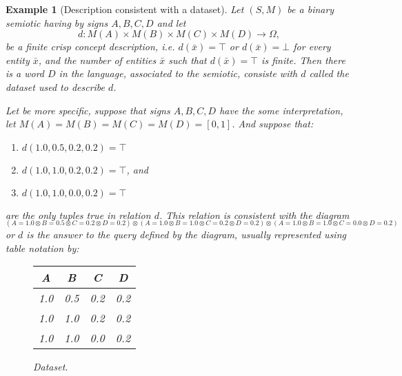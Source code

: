 \documentclass[oribibl]{llncs}
\newtheorem{exam}{Example}
\begin{document}
\begin{exam}[Description consistent with a dataset]
Let $(S,M)$ be a binary semiotic having by signs $A,B,C,D$ and let \[d:M(A)\times M(B)\times M(C)\times M(D)\rightarrow \Omega,\] be a finite crisp concept description, i.e. $d(\bar{x})=\top$ or $d(\bar{x})=\bot$ for every entity $\bar{x}$, and the number of entities $\bar{x}$ such that $d(\bar{x})=\top$ is finite. Then there is a word $D$ in the language, associated to the semiotic, consiste with $d$ called the dataset used to describe $d$.

Let be more specific, suppose that signs $A,B,C,D$ have the some interpretation, let $M(A)=M(B)=M(C)=M(D)=[0,1]$. And suppose that:
\begin{enumerate}
  \item $d(1.0,0.5,0.2,0.2)=\top$
  \item $d(1.0,1.0,0.2,0.2)=\top$, and
  \item $d(1.0,1.0,0.0,0.2)=\top$
\end{enumerate}
 are the only tuples true in relation $d$. This relation is consistent with the diagram
\[_{(A=1.0 \otimes B=0.5 \otimes C=0.2 \otimes D=0.2)\otimes (A=1.0 \otimes B=1.0 \otimes C=0.2 \otimes D=0.2)\otimes (A=1.0 \otimes B=1.0 \otimes C=0.0 \otimes D=0.2)}\]or $d$ is the answer to the query defined by the diagram,
usually represented using table notation by:
\begin{figure}[h]
\begin{center}
\begin{tabular}{|c|c|c|c|}
  \hline
  A & B & C & D \\
  \hline
  1.0 & 0.5 & 0.2 & 0.2 \\
  1.0 & 1.0 & 0.2 & 0.2 \\
  1.0 & 1.0 & 0.0 & 0.2 \\
  \hline
\end{tabular}
\end{center}
\caption{Dataset.}\label{dataset}
\end{figure}
\end{exam}
\end{document}
